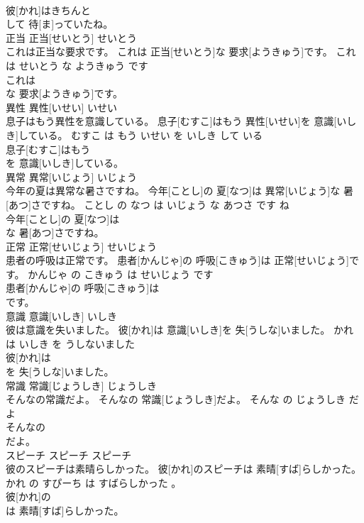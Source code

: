 \documentclass[8pt]{extreport}
\begin{document}
\begin{CJK}{UTF8}{min}
\\	彼[かれ]はきちんと
\\	して 待[ま]っていたね。			
\\	正当	正当[せいとう]	せいとう	
\\	これは正当な要求です。	これは 正当[せいとう]な 要求[ようきゅう]です。	これ は せいとう な ようきゅう です	
\\	これは
\\	な 要求[ようきゅう]です。			
\\	異性	異性[いせい]	いせい	
\\	息子はもう異性を意識している。	息子[むすこ]はもう 異性[いせい]を 意識[いしき]している。	むすこ は もう いせい を いしき して いる	
\\	息子[むすこ]はもう
\\	を 意識[いしき]している。			
\\	異常	異常[いじょう]	いじょう	
\\	今年の夏は異常な暑さですね。	今年[ことし]の 夏[なつ]は 異常[いじょう]な 暑[あつ]さですね。	ことし の なつ は いじょう な あつさ です ね	
\\	今年[ことし]の 夏[なつ]は
\\	な 暑[あつ]さですね。			
\\	正常	正常[せいじょう]	せいじょう	
\\	患者の呼吸は正常です。	患者[かんじゃ]の 呼吸[こきゅう]は 正常[せいじょう]です。	かんじゃ の こきゅう は せいじょう です	
\\	患者[かんじゃ]の 呼吸[こきゅう]は
\\	です。			
\\	意識	意識[いしき]	いしき	
\\	彼は意識を失いました。	彼[かれ]は 意識[いしき]を 失[うしな]いました。	かれ は いしき を うしないました	
\\	彼[かれ]は
\\	を 失[うしな]いました。			
\\	常識	常識[じょうしき]	じょうしき	
\\	そんなの常識だよ。	そんなの 常識[じょうしき]だよ。	そんな の じょうしき だ よ	
\\	そんなの
\\	だよ。			
\\	スピーチ	スピーチ	スピーチ	
\\	彼のスピーチは素晴らしかった。	彼[かれ]のスピーチは 素晴[すば]らしかった。	かれ の すぴーち は すばらしかった 。	
\\	彼[かれ]の
\\	は 素晴[すば]らしかった。			

\end{CJK}
\end{document}
